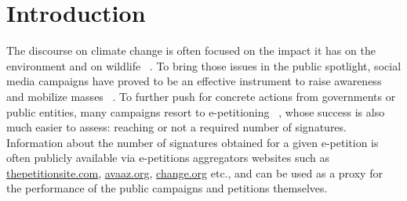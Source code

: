 \section{Introduction}
\label{sec:intro}

%
%

The discourse on climate change is often focused on the impact it has on the environment and on  wildlife~\citeauthor{solomon2009irreversible} .
To bring those issues in the public spotlight, social media campaigns have proved to be an effective instrument to raise awareness and mobilize masses~\citeauthor{Pearce2014} .
To further push for concrete actions from governments or public entities, many campaigns resort to e-petitioning~\citeauthor{mosca2009petitioning} , whose success is also much easier to assess: reaching or not a required number of signatures.
Information about the number of signatures obtained for a given e-petition is often publicly available via e-petitions aggregators websites such as \url{thepetitionsite.com}, \url{avaaz.org}, \url{change.org} etc., and can be used as a proxy for the performance of the public campaigns and petitions themselves.

%

